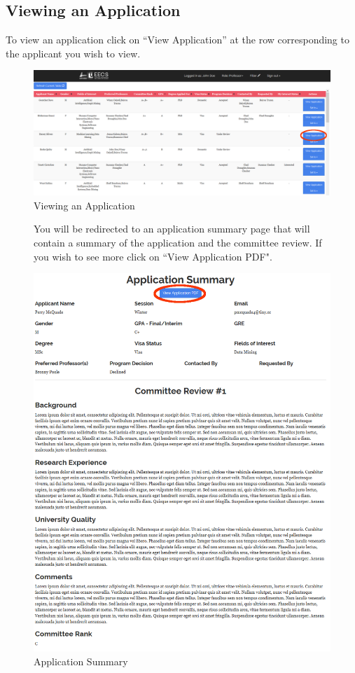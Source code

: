 \documentclass[fontsize=12pt,paper=letter,twoside]{scrartcl}
\begin{document}
\subsection{Viewing an Application}
To view an application click on ``View Application'' at the row corresponding to the applicant you wish to view.
\begin{figure}[!htb]
\begin{center}
\includegraphics[width=.99\textwidth]{images/prof/view_app.png}
\end{center}
\caption{Viewing an Application}
\end{figure}
\begin{figure}[!htb]
You will be redirected to an application summary page that will contain a summary of the application and the committee review. If you wish to see more click on ``View Application PDF".
\begin{center}
\includegraphics[width=.99\textwidth]{images/prof/viewapp.png}
\end{center}
\caption{Application Summary}
\label{fig:prof/sorted_table}
\end{figure}
\clearpage
\end{document}
